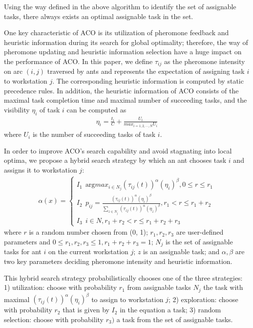 Using the way defined in the above algorithm to identify the set of assignable tasks, there always exists an optimal assignable task in the set.

One key characteristic of ACO is its utilization of pheromone feedback and heuristic information during its search for global optimality; therefore, the way of pheromone updating and heuristic information selection have a huge impact on the performance of ACO.
In this paper, we define $\tau_{ij}$ as the pheromone intensity on arc $(i,j)$ traversed by ants and represents the expectation of assigning task $i$ to workstation $j$.
The corresponding heuristic information is computed by static precedence rules.
In addition, the heuristic information of ACO consists of the maximal task completion time and maximal number of succeeding tasks, and the visibility $\eta_i$ of task $i$ can be computed as
\begin{align}
	\eta_i = \frac{t_i}{C} + \frac{U_i}{max_{i = 1, 2, \cdots, N}U_i}
\end{align}
where $U_i$ is the number of succeeding tasks of task $i$.

In order to improve ACO's search capability and avoid stagnating into local optima, we propose a hybrid search strategy by which an ant chooses task $i$ and assigns it to workstation $j$:
\begin{align}
	\alpha(x)=\begin{cases}
	I_1 \ \ \text{arg} max_{i \in N_j}(\tau_{ij}(t))^{\alpha} (\eta_i)^{\beta}, 0 \leq r \leq r_1 \\
	I_2 \ \ p_{ij} = \frac{(\tau_{ij}(t))^{\alpha} (\eta_i)^{\beta}}{\sum_{z \in N_j}(\tau_{zj}(t))^{\alpha} (\eta_z)^{\beta}}, r_1 < r \leq r_1 + r_2 \\
	I_3 \ \ i \in N, r_1 + r_2 < r \leq r_1 + r_2 + r_3
	\end{cases} \label{formula7}
\end{align}
where $r$ is a random number chosen from (0, 1); $r_1, r_2, r_3$ are user-defined parameters and $0 \leq r_1, r_2, r_3 \leq 1, r_1 + r_2 + r_3 = 1$; $N_j$ is the set of assignable tasks for ant $i$ on the current workstation $j$; $z$ is an assignable task; and $\alpha, \beta$ are two key parameters deciding pheromone intensity and heuristic information.

This hybrid search strategy probabilistically chooses one of the three strategies: 1) utilization: choose with probability $r_1$ from assignable tasks $N_j$ the task with maximal $(\tau_{ij}(t))^{\alpha} (\eta_i)^{\beta}$ to assign to workstation $j$; 2) exploration: choose with probability $r_2$ that is given by $I_2$ in the equation a task; 3) random selection: choose with probability $r_3)$ a task from the set of assignable tasks.

